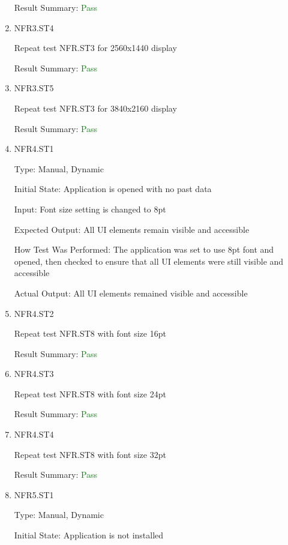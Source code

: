 \documentclass[12pt, titlepage]{article}
\begin{document}
\begin{enumerate}
Result Summary: \textcolor{green} {Pass}

\item{NFR3.ST4\\}

Repeat test NFR.ST3 for 2560x1440 display

Result Summary: \textcolor{green} {Pass}

\item{NFR3.ST5\\}

Repeat test NFR.ST3 for 3840x2160 display

Result Summary: \textcolor{green} {Pass}

\item{NFR4.ST1\\}

Type: Manual, Dynamic

Initial State: Application is opened with no past data

Input: Font size setting is changed to 8pt

Expected Output: All UI elements remain visible and accessible

How Test Was Performed: The application was set to use 8pt font and opened, then checked to ensure that all UI elements were still visible and accessible

Actual Output: All UI elements remained visible and accessible

\item{NFR4.ST2\\}

Repeat test NFR.ST8 with font size 16pt

Result Summary: \textcolor{green} {Pass}

\item{NFR4.ST3\\}

Repeat test NFR.ST8 with font size 24pt

Result Summary: \textcolor{green} {Pass}

\item{NFR4.ST4\\}

Repeat test NFR.ST8 with font size 32pt

Result Summary: \textcolor{green} {Pass}

\item{NFR5.ST1\\}

Type: Manual, Dynamic

Initial State: Application is not installed


\end{enumerate}
\end{document}

